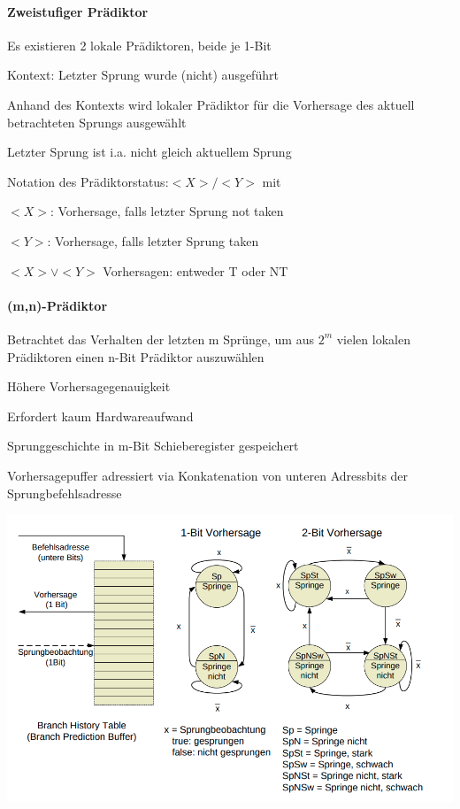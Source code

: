\documentclass[10pt,landscape]{article}
\begin{document}
\begin{multicols}{3}
  \paragraph{Zweistufiger Prädiktor}
  \begin{itemize*}
    \item Es existieren 2 lokale Prädiktoren, beide je 1-Bit
    \item Kontext: Letzter Sprung wurde (nicht) ausgeführt
    \item Anhand des Kontexts wird lokaler Prädiktor für die Vorhersage des aktuell betrachteten Sprungs ausgewählt
    \item Letzter Sprung ist i.a. nicht gleich aktuellem Sprung
    \item Notation des Prädiktorstatus:$<X>/<Y>$ mit
    \item $<X>$: Vorhersage, falls letzter Sprung not taken
    \item $<Y>$: Vorhersage, falls letzter Sprung taken
    \item $<X>\vee<Y>$ Vorhersagen: entweder T oder NT
  \end{itemize*}
  
  \paragraph{(m,n)-Prädiktor}
  \begin{itemize*}
    \item Betrachtet das Verhalten der letzten m Sprünge, um aus $2^m$ vielen lokalen Prädiktoren einen n-Bit Prädiktor auszuwählen
    \item Höhere Vorhersagegenauigkeit
    \item Erfordert kaum Hardwareaufwand
    \item Sprunggeschichte in m-Bit Schieberegister gespeichert
    \item Vorhersagepuffer adressiert via Konkatenation von unteren Adressbits der Sprungbefehlsadresse
  \end{itemize*}
  
  \begin{center}
    \includegraphics[width=\textwidth/7]{Assets/RA2_Vorhersagen.png}
  \end{center}
  

\end{multicols}
\end{document}
